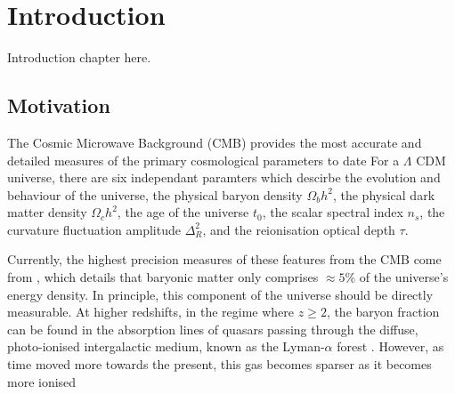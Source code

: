 \chapter{Introduction}
Introduction chapter here. 

\section{Motivation}
The Cosmic Microwave Background (CMB) provides the most accurate and detailed measures of the primary cosmological parameters to date %
For a $\Lambda$ CDM universe, there are six independant paramters which descirbe the evolution and behaviour of the universe, the physical baryon density $\Omega_b h^2$, the physical dark matter density $\Omega_c h^2$, the age of the universe $t_0$, the scalar spectral index $n_s$, the curvature fluctuation amplitude $\Delta_R^2$, and the reionisation optical depth $\tau$. 

Currently, the highest precision measures of these features from the CMB come from \cite{2018arXiv180706209P}, which details that baryonic matter only comprises $\approx 5 \% $ of the universe's energy density. In principle, this component of the universe should be directly measurable. At higher redshifts, in the regime where $z \geqslant 2$, the baryon fraction can be found in the absorption lines of quasars passing through the diffuse, photo-ionised intergalactic medium, known as the Lyman-$\alpha$ forest \citep{1997ApJ...490..564W}. However, as time moved more towards the present, this gas becomes sparser as it becomes more ionised



